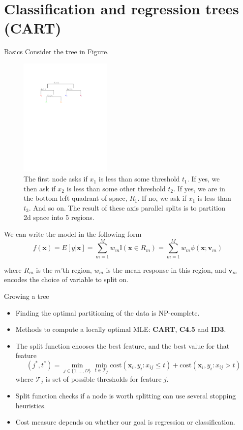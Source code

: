 \documentclass[10pt,mathserif]{beamer}
\begin{document}
\section{Classification and regression trees (CART)}
\begin{frame}{Basics}
Consider the tree in Figure.
\begin{figure}[h]
\centering
\includegraphics[width=0.4\textwidth]{regtree}
\caption{The first node asks if $x_1$ is less than some threshold $t_1$. If yes, we then ask if $x_2$ is less than some other threshold $t_2$. If yes, we are in the bottom left quadrant of space, $R_1$. If no, we ask if $x_1$ is less than $t_3$. And so on. The result of these axis parallel splits is to partition 2d space into 5 regions.}
\end{figure}

We can write the model in the following form
\begin{equation*}
    f(\bm{x}) = E[y|\bm{x}] = \sum_{m=1}^M w_m \mathbb{I}(\bm{x} \in R_m) = \sum_{m=1}^M w_m \phi(\bm{x}; \bm{v}_m)
\end{equation*}

where $R_m$ is the $m$'th region, $w_m$ is the mean response in this region, and $\bm{v}_m$ encodes the choice of variable to split on.
\end{frame}

\begin{frame}{Growing a tree}
\begin{itemize}
    \item Finding the optimal partitioning of the data is NP-complete.
    \item Methods to compute a locally optimal MLE: \textbf{CART}, \textbf{C4.5} and \textbf{ID3}.
    \item  The split function chooses the best feature, and the best value for that feature
    \begin{equation*}
        (j^*, t^*) = \min_{j\in\{1,\ldots,D\}}\min_{t\in\mathcal{T}_j}\text{cost}({\bm{x}_i, y_i: x_{ij} \leq t}) + \text{cost}({\bm{x}_i, y_i: x_{ij}> t})
    \end{equation*}
    where $\mathcal{T}_j$ is set of possible thresholds for feature $j$.
    \item Split function checks if a node is worth splitting can use several stopping heuristics.
    \item Cost measure depends on whether our goal is regression or classification.
\end{itemize}
\end{frame}
\end{document}
